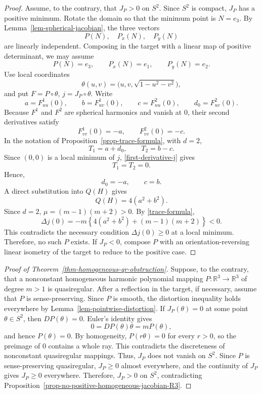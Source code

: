 \documentclass[10pt]{amsart}
\numberwithin{equation}{section}
\theoremstyle{definition}
\newcommand{\R}{\mathbb R}
\begin{document}
\begin{proof}
Assume, to the contrary, that \(J_P>0\) on \(S^2\). Since \(S^2\) is compact,
\(J_P\) has a positive minimum. Rotate the domain so that the minimum point
is \(N=e_3\). By Lemma~\ref{lem-spherical-jacobian}, the three vectors
\[
        P(N),\quad P_x(N),\quad P_y(N)
\]
are linearly independent. Composing in the target with a linear map of
positive determinant, we may assume
\[
        P(N)=e_3,
        \qquad
        P_x(N)=e_1,
        \qquad
        P_y(N)=e_2.
\]
Use local coordinates
\[
        \theta(u,v)=\bigl(u,v,\sqrt{1-u^2-v^2}\bigr),
\]
and put \(F=P\circ\theta\), \(j=J_P\circ\theta\). Write
\[
        a=F^1_{uu}(0),
        \qquad
        b=F^1_{uv}(0),
        \qquad
        c=F^2_{uu}(0),
        \qquad
        d_0=F^2_{uv}(0).
\]
Because \(F^1\) and \(F^2\) are spherical harmonics and vanish at \(0\),
their second derivatives satisfy
\[
        F^1_{vv}(0)=-a,
        \qquad
        F^2_{vv}(0)=-c.
\]
In the notation of Proposition~\ref{prop-trace-formula}, with \(d=2\),
\[
        T_1=a+d_0,
        \qquad
        T_2=b-c.
\]
Since \((0,0)\) is a local minimum of \(j\), \eqref{first-derivative-j} gives
\[
        T_1=T_2=0.
\]
Hence,
\[
        d_0=-a,
        \qquad
        c=b.
\]
A direct substitution into \(Q(H)\) gives
\[
        Q(H)=4(a^2+b^2).
\]
Since \(d=2\), \(\mu=(m-1)(m+2)>0\). By \eqref{trace-formula},
\[
        \Delta j(0)
        =
        -m\left\{4(a^2+b^2)+(m-1)(m+2)\right\}<0.
\]
This contradicts the necessary condition \(\Delta j(0)\ge0\) at a local
minimum. Therefore, no such \(P\) exists. If \(J_P<0\), compose \(P\) with an
orientation-reversing linear isometry of the target to reduce to the positive
case.
\end{proof}

\begin{proof}[Proof of Theorem~\ref{thm-homogeneous-qr-obstruction}]
Suppose, to the contrary, that a nonconstant homogeneous harmonic polynomial
mapping \(P:\R^3\to\R^3\) of degree \(m>1\) is quasiregular. After a
reflection in the target, if necessary, assume that \(P\) is
sense-preserving. Since \(P\) is smooth, the distortion inequality holds
everywhere by Lemma~\ref{lem-pointwise-distortion}. If \(J_P(\theta)=0\) at
some point \(\theta\in S^2\), then \(DP(\theta)=0\). Euler's identity gives
\[
        0=DP(\theta)\theta=mP(\theta),
\]
and hence \(P(\theta)=0\). By homogeneity, \(P(r\theta)=0\) for every
\(r>0\), so the preimage of \(0\) contains a whole ray. This contradicts the
discreteness of nonconstant quasiregular mappings. Thus, \(J_P\) does not
vanish on \(S^2\). Since \(P\) is sense-preserving quasiregular, \(J_P\ge0\)
almost everywhere, and the continuity of \(J_P\) gives \(J_P\ge0\) everywhere.
Therefore, \(J_P>0\) on \(S^2\), contradicting
Proposition~\ref{prop-no-positive-homogeneous-jacobian-R3}.
\end{proof}
\end{document}

